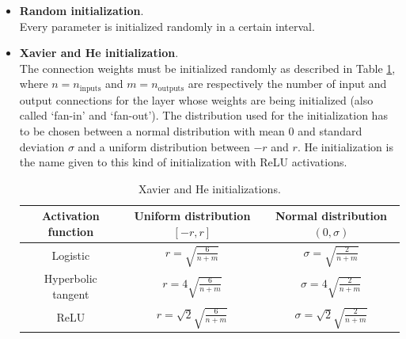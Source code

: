 \begin{itemize}
	\item \textbf{Random initialization}. \\
	Every parameter is initialized randomly in a certain interval.
	
    \item \textbf{Xavier and He initialization}. \\
    The connection weights must be initialized randomly as described in Table \ref{tab:XAVIER_HE_INITIALIZATIONS}, where $n=n_\text{inputs}$ and $m=n_\text{outputs}$ are respectively the number of input and output connections for the layer whose weights are being initialized (also called `fan-in' and `fan-out'). The distribution used for the initialization has to be chosen between a normal distribution with mean 0 and standard deviation $\sigma$ and a uniform distribution between $-r$ and $r$. He initialization is the name given to this kind of initialization with ReLU activations.
    
    \begin{table}[H]
        \centering
        \begin{tabular}{c c c}
        	\toprule
            \toprule
             Activation function    &   Uniform distribution $[-r,r]$   &   Normal distribution $(0,\sigma)$   \\
             \toprule
             Logistic   &
             $ \displaystyle
                 r = \sqrt{\frac{6}{n+m}}
             $    &
             $ \displaystyle
                 \sigma = \sqrt{\frac{2}{n+m}}
             $ \\
             Hyperbolic tangent   &
             $ \displaystyle
                 r = 4 \sqrt{\frac{6}{n+m}}
             $    &
             $ \displaystyle
                 \sigma = 4 \sqrt{\frac{2}{n+m}}
             $ \\
             ReLU   &
             $ \displaystyle
                 r = \sqrt{2} \sqrt{\frac{6}{n+m}}
             $    &
             $ \displaystyle
                 \sigma = \sqrt{2} \sqrt{\frac{2}{n+m}}
             $ \\
             \bottomrule
             \bottomrule
        \end{tabular}
        \caption{Xavier and He initializations.}
        \label{tab:XAVIER_HE_INITIALIZATIONS}
    \end{table}
\end{itemize}
